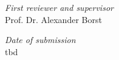 \hfill

\vfill

\textit{First reviewer and supervisor} \\
Prof. Dr. Alexander Borst

\bigskip



\textit{Date of submission} \\
tbd



